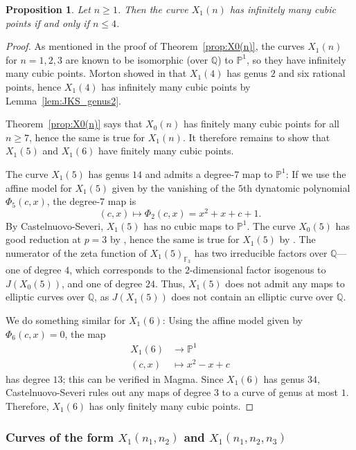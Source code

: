 \documentclass[12pt]{amsart}
\newtheorem{prop}[thm]{Proposition}
\theoremstyle{definition}
\newcommand{\bbF}{\mathbb{F}}
\newcommand{\bbP}{\mathbb{P}}
\newcommand{\bbQ}{\mathbb{Q}}
\newcommand{\longto}{\longrightarrow}
\numberwithin{equation}{section}
\begin{document}
\begin{prop}\label{prop:X1(n)}
    Let $n \ge 1$. Then the curve $X_1(n)$ has infinitely many cubic points if and only if $n \le 4$.
\end{prop}

\begin{proof}
As mentioned in the proof of Theorem~\ref{prop:X0(n)}, the curves $X_1(n)$ for $n=1,2,3$ are known to be isomorphic (over $\bbQ$) to $\bbP^1$, so they have infinitely many cubic points.
Morton showed in \cite{morton:1998} that $X_1(4)$ has genus $2$ and six rational points, hence $X_1(4)$ has infinitely many cubic points by Lemma~\ref{lem:JKS_genus2}.

Theorem~\ref{prop:X0(n)} says that $X_0(n)$ has finitely many cubic points for all $n \ge 7$, hence the same is true for $X_1(n)$. It therefore remains to show that $X_1(5)$ and $X_1(6)$ have finitely many cubic points.

The curve $X_1(5)$ has genus $14$ and admits a degree-$7$ map to $\bbP^1$: If we use the affine model for $X_1(5)$ given by the vanishing of the $5$th dynatomic polynomial $\Phi_5(c,x)$, the degree-$7$ map is
    \[
    (c,x) \mapsto \Phi_2(c,x) = x^2 + x + c + 1.
    \]
By Castelnuovo-Severi, $X_1(5)$ has no cubic maps to $\bbP^1$. The curve $X_0(5)$ has good reduction at $p = 3$ by \cite{flynn/poonen/schaefer:1997}, hence the same is true for $X_1(5)$ by \cite[Theorem D]{doyle/etal:2019}. The numerator of the zeta function of $X_1(5)_{\bbF_3}$ has two irreducible factors over $\mathbb{Q}$---one of degree $4$, which corresponds to the $2$-dimensional factor isogenous to $J(X_0(5))$, and one of degree $24$. Thus, $X_1(5)$ does not admit any maps to elliptic curves over $\mathbb{Q}$, as $J(X_1(5))$ does not contain an elliptic curve over $\mathbb{Q}$.

We do something similar for $X_1(6)$: Using the affine model given by $\Phi_6(c,x) = 0$, the map
    \begin{align*}
        X_1(6) &\longto \bbP^1\\
        (c,x) &\longmapsto x^2 - x + c
    \end{align*}
has degree $13$; this can be verified in Magma. Since $X_1(6)$ has genus $34$, Castelnuovo-Severi rules out any maps of degree $3$ to a curve of genus at most $1$. Therefore, $X_1(6)$ has only finitely many cubic points.
\end{proof}

\subsubsection{Curves of the form $X_1(n_1,n_2)$ and $X_1(n_1,n_2,n_3)$} 
\end{document}
